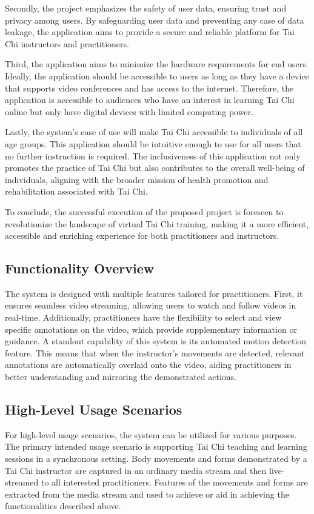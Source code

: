 \documentclass[12pt]{article}
\begin{document}
Secondly, the project emphasizes the safety of user data, ensuring trust and privacy among users. By safeguarding user data and preventing any case of data leakage, the application aims to provide a secure and reliable platform for Tai Chi instructors and practitioners.

Third, the application aims to minimize the hardware requirements for end users. Ideally, the application should be accessible to users as long as they have a device that supports video conferences and has access to the internet. Therefore, the application is accessible to audiences who have an interest in learning Tai Chi online but only have digital devices with limited computing power.

Lastly, the system’s ease of use will make Tai Chi accessible to individuals of all age groups. This application should be intuitive enough to use for all users that no further instruction is required. The inclusiveness of this application not only promotes the practice of Tai Chi but also contributes to the overall well-being of individuals, aligning with the broader mission of health promotion and rehabilitation associated with Tai Chi.

To conclude, the successful execution of the proposed project is foreseen to revolutionize the landscape of virtual Tai Chi training, making it a more efficient, accessible and enriching experience for both practitioners and instructors.

\subsection{Functionality Overview}
The system is designed with multiple features tailored for practitioners. First, it ensures seamless video streaming, allowing users to watch and follow videos in real-time. Additionally, practitioners have the flexibility to select and view specific annotations on the video, which provide supplementary information or guidance. A standout capability of this system is its automated motion detection feature. This means that when the instructor's movements are detected, relevant annotations are automatically overlaid onto the video, aiding practitioners in better understanding and mirroring the demonstrated actions.
\subsection{High-Level Usage Scenarios}
For high-level usage scenarios, the system can be utilized for various purposes. The primary intended usage scenario is supporting Tai Chi teaching and learning sessions in a synchronous setting. Body movements and forms demonstrated by a Tai Chi instructor are captured in an ordinary media stream and then live-streamed to all interested practitioners. Features of the movements and forms are extracted from the media stream and used to achieve or aid in achieving the functionalities described above.
\end{document}
